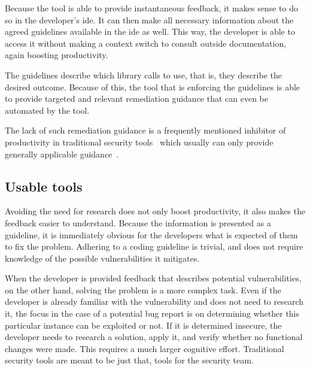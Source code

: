 Because the tool is able to provide instantaneous feedback, it makes sense to do so in the developer's \gls{ide}.
It can then make all necessary information about the agreed guidelines available in the \gls{ide} as well.
This way, the developer is able to access it without making a context switch to consult outside documentation, again boosting productivity.

The guidelines describe which library calls to use, that is, they describe the desired outcome.
Because of this, the tool that is enforcing the guidelines is able to provide targeted and relevant remediation guidance that can even be automated by the tool.

The lack of such remediation guidance is a frequently mentioned inhibitor of productivity in traditional security tools~\cite{shiftleftsurvey} which usually can only provide generally applicable guidance~\cite{baset2017ide}.

\subsection{Usable tools}
Avoiding the need for research does not only boost productivity, it also makes the feedback easier to understand.
Because the information is presented as a guideline, it is immediately obvious for the developers what is expected of them to fix the problem. Adhering to a coding guideline is trivial, and does not require knowledge of the possible vulnerabilities it mitigates.

When the developer is provided feedback that describes potential vulnerabilities, on the other hand, solving the problem is a more complex task. Even if the developer is already familiar with the \gls{vulnerability} and does not need to research it, the focus in the case of a potential bug report is on determining whether this particular instance can be exploited or not. If it is determined insecure, the developer needs to research a solution, apply it, and verify whether no functional changes were made. This requires a much larger cognitive effort. Traditional security tools are meant to be just that, tools for the security team.

